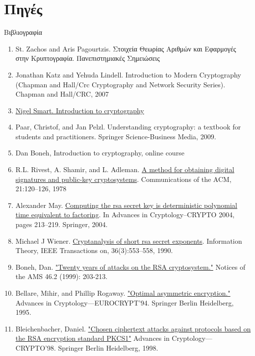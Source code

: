 \documentclass[handout]{beamer}
\begin{document}
\section{Πηγές}
\begin{frame}{Βιβλιογραφία}
\begin{tiny}
\begin{enumerate}
\item St. Zachos and Aris Pagourtzis. Στοιχεία Θεωρίας Αριθμών και Εφαρμογές στην Κρυπτογραφία. Πανεπιστημιακές Σημειώσεις
\item Jonathan Katz and Yehuda Lindell. Introduction to Modern Cryptography (Chapman and Hall/Crc Cryptography and Network Security Series). Chapman
and Hall/CRC, 2007
\item \href{http://goo.gl/b75I29}{Nigel Smart. Introduction to cryptography} 
\item Paar, Christof, and Jan Pelzl. Understanding cryptography: a textbook for students and practitioners. Springer Science-Business Media, 2009.
\item Dan Boneh, Introduction to cryptography, online course
\medskip
\item R.L. Rivest, A. Shamir, and L. Adleman. \href{https://people.csail.mit.edu/rivest/Rsapaper.pdf}{A method for obtaining digital signatures and public-key cryptosystems}. Communications of the ACM,
21:120–126, 1978
\item  Alexander May. \href{https://www.iacr.org/archive/crypto2004/31520213/det.pdf}{Computing the rsa secret key is deterministic polynomial time equivalent to factoring}. In Advances in Cryptology–CRYPTO 2004,
pages 213–219. Springer, 2004.
\item Michael J Wiener. \href{http://igm.univ-mlv.fr/~jyt/Crypto/4/10.1.1.92.5261.pdf}{Cryptanalysis of short rsa secret exponents}. Information Theory, IEEE Transactions on, 36(3):553–558, 1990.
\item Boneh, Dan. \href{http://www.ams.org/notices/199902/boneh.pdf}{"Twenty years of attacks on the RSA cryptosystem."} Notices of the AMS 46.2 (1999): 203-213.
\item Bellare, Mihir, and Phillip Rogaway. \href{https://cseweb.ucsd.edu/~mihir/papers/oae.pdf}{"Optimal asymmetric encryption."} Advances in Cryptology—EUROCRYPT'94. Springer Berlin Heidelberg, 1995.
\item Bleichenbacher, Daniel. \href{http://archiv.infsec.ethz.ch/education/fs08/secsem/Bleichenbacher98.pdf}{"Chosen ciphertext attacks against protocols based on the RSA encryption standard PKCS1"} Advances in Cryptology—CRYPTO'98. Springer Berlin Heidelberg, 1998.
\end{enumerate}
\end{tiny}
\end{frame}

 
\end{document}
